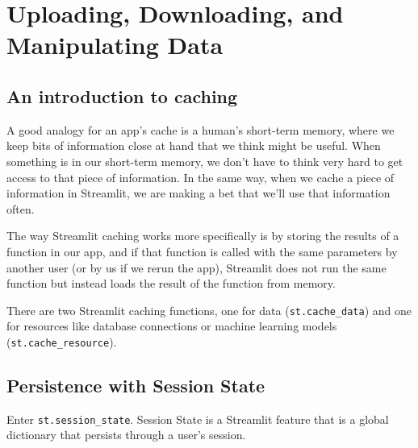 \chapter{Uploading, Downloading, and Manipulating Data\label{ch02}}
\section{An introduction to caching}
A good analogy for an app's cache is a human's short-term memory, where we keep bits of information close at hand that we think might be useful. When something is in our short-term memory, we don't have to think very hard to get access to that piece of information. In the same way, when we cache a piece of information in Streamlit, we are making a bet that we'll use that information often.

The way Streamlit caching works more specifically is by storing the results of a function in our app, and if that function is called with the same parameters by another user (or by us if we rerun the app), Streamlit does not run the same function but instead loads the result of the function from memory.

There are two Streamlit caching functions, one for data (\verb|st.cache_data|) and one for resources like database connections or machine learning models (\verb|st.cache_resource|).

\section{Persistence with Session State}
Enter \verb|st.session_state|. Session State is a Streamlit feature that is a global dictionary that persists through a user’s session.